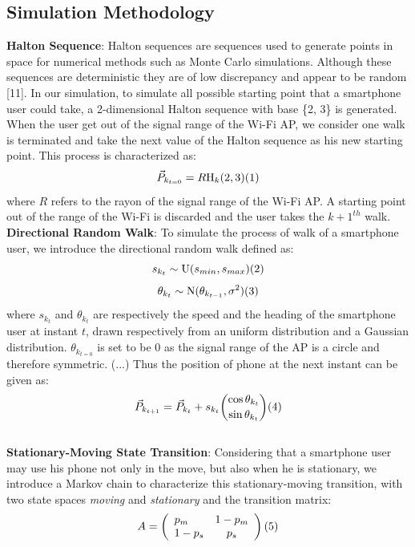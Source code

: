 \documentclass[journal]{IEEEtran}
\begin{document}
\subsection{Simulation Methodology}
{\bf Halton Sequence}: Halton sequences are sequences used to generate points in space for numerical methods such as Monte Carlo simulations.
Although these sequences are deterministic they are of low discrepancy and appear to be random [11].
In our simulation, to simulate all possible starting point that a smartphone user could take, 
a 2-dimensional Halton sequence with base \{2, 3\} is generated. 
When the user get out of the signal range of the Wi-Fi AP, we consider one walk is terminated and take the next value of the Halton sequence 
as his new starting point. This process is characterized as:
\[ \vec{P}_{k_{t=0}} = R\textrm{H}_{k}(2, 3) \relax(1) \]
where $R$ refers to the rayon of the signal range of the Wi-Fi AP. A starting point out of the range of the Wi-Fi is discarded and the user takes
the $k+1^{th}$ walk.
\\
\indent
{\bf Directional Random Walk}: To simulate the process of walk of a smartphone user, we introduce the directional random walk defined as:
$$ s_{k_{t}} \sim \textrm{U}(s_{min}, s_{max}) \relax(2) $$
$$ \theta_{k_{t}} \sim \textrm{N}(\theta_{k_{t-1}}, \sigma^2) \relax(3) $$
where $s_{k_{t}}$ and $\theta_{k_{t}}$ are respectively the speed and the heading of the smartphone user at instant $t$, drawn respectively 
from an uniform distribution and a Gaussian distribution. $\theta_{k_{t=0}}$ is set to be 0 as the signal range of the AP is a circle and 
therefore symmetric. (...) 
Thus the position of phone at the next instant can be given as:
\[ \vec{P}_{k_{t+1}} = \vec{P}_{k_{t}} + s_{k_{t}}{\cos\theta_{k_{t}} \choose \sin\theta_{k_{t}}} \relax(4) \]
\\
\indent 
{\bf Stationary-Moving State Transition}: Considering that a smartphone user may use his phone not only in the move, but also when he 
is stationary, we introduce a Markov chain to characterize this stationary-moving transition, with two state spaces \textit{moving} and \textit{stationary} 
and the transition matrix:
$$ 
A= \left(\begin{array}{lcr} p_{m} & 1-p_{m} \\
         1-p_{s} & p_{s} 	
      \end{array} \right) \relax(5)
$$
\end{document}
